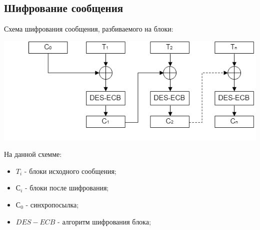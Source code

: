 \graphicspath{ {../img/} }

\subsection{Шифрование сообщения}
Схема шифрования сообщения, разбиваемого на блоки:
\begin{center}
\includegraphics[scale=0.5]{des_CBC_cipher}
\end{center}
На данной схемме:
\begin{itemize}
\item $T_i$ \-- блоки исходного сообщения;
\item $С_i$ \-- блоки после шифрования;
\item $С_0$ \-- синхропосылка;
\item $DES-ECB$ \-- алгоритм шифрования блока;
\end{itemize}

